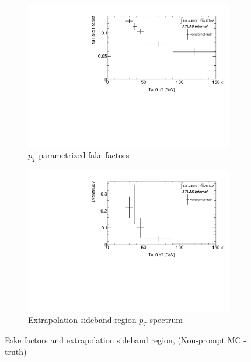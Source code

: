 \documentclass[11pt]{article}
\begin{document}
	\begin{figure}[H]
	\centering
	\begin{subfigure}{.5\textwidth}
	\centering
	\includegraphics[width=0.95\linewidth]{figures/FakesEstimate_data_pp8_nonallhad_new_scaledHists/FF_Faketau_Nonprompt-truth.pdf}
  	\caption{$p_T$-parametrized fake factors}
  	\label{fig:sub1}
	\end{subfigure}%
	\begin{subfigure}{.5\textwidth}
	\centering
	\includegraphics[width=0.95\linewidth]{figures/FakesEstimate_data_pp8_nonallhad_new_scaledHists/hist_Extrapolation_Nonprompt-truth.pdf}
	\caption{Extrapolation sideband region $p_T$ spectrum}
	\end{subfigure}
	\caption{Fake factors and extrapolation sideband region, (Non-prompt MC - truth)}
	\end{figure}
\end{document}

